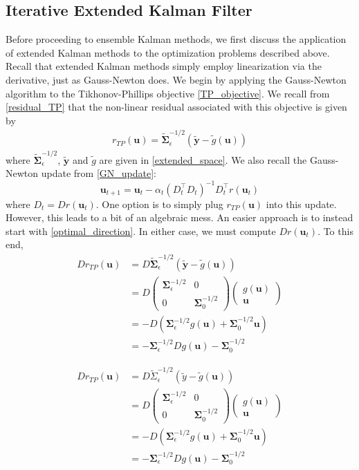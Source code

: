 \documentclass[12pt]{article}
\newcommand{\bpar}{\mathbf{u}} %
\newcommand{\fwd}{g} %
\newcommand{\dataVec}{\mathbf{y}} %
\newcommand{\CovObs}{\boldsymbol{\Sigma}_{\epsilon}} %
\newcommand{\CovPrior}{\boldsymbol{\Sigma}_0} %
\newcommand{\CovObsEx}{\tilde{\boldsymbol{\Sigma}}_{\epsilon}} %
\newcommand{\dataVecEx}{\tilde{\dataVec}} %
\newcommand{\fwdEx}{\tilde{\fwd}} %
\begin{document}
\subsection{Iterative Extended Kalman Filter}
Before proceeding to ensemble Kalman methods, we first discuss the application of extended Kalman methods to the optimization problems described above. Recall that extended Kalman methods simply employ 
linearization via the derivative, just as Gauss-Newton does. We begin by applying the Gauss-Newton algorithm to the Tikhonov-Phillips objective \ref{TP_objective}. We recall from \ref{residual_TP} 
that the non-linear residual associated 
with this objective is given by 
\begin{align*}
r_{TP}(\bpar) = \CovObsEx^{-1/2} (\dataVecEx -\fwdEx(\bpar))
\end{align*}
where $\CovObsEx^{-1/2}$, $\dataVecEx$ and $\fwdEx$ are given in \ref{extended_space}. We also recall the Gauss-Newton update from \ref{GN_update}:
\[ \bpar_{t + 1} = \bpar_t - \alpha_t \left(D_t^\top D_t \right)^{-1} D_t^\top r(\bpar_t) \]
where $D_t = D r(\bpar_t)$. One option is to simply plug $r_{TP}(\bpar)$ into this update. However, this leads to a bit of an algebraic mess. An easier approach is to instead start 
with \ref{optimal_direction}. In either case, we must compute $D r(\bpar_t)$. To this end, 
\begin{align*}
D r_{TP}(\bpar) &= D \CovObsEx^{-1/2} (\dataVecEx - \fwdEx(\bpar)) \\ 
		        &= D \begin{pmatrix} \CovObs^{-1/2} & 0 \\ 0 & \CovPrior^{-1/2} \end{pmatrix} \begin{pmatrix} \fwd(\bpar) \\ \bpar \end{pmatrix} \\
		        &= -D\left(\CovObs^{-1/2} \fwd(\bpar) + \CovPrior^{-1/2}\bpar \right) \\
			&= -\CovObs^{-1/2} D\fwd(\bpar) - \CovPrior^{-1/2}
\end{align*}


\begin{align*}
D r_{TP}(\bpar) &= D \tilde{\Sigma}^{-1/2}_{\epsilon} (\tilde{y} - \tilde{\fwd}(\bpar)) \\
			&= D \begin{pmatrix} \CovObs^{-1/2} & 0 \\ 0 & \CovPrior^{-1/2} \end{pmatrix} \begin{pmatrix} \fwd(\bpar) \\ \bpar \end{pmatrix} \\
			&= -D\left(\CovObs^{-1/2} \fwd(\bpar) + \CovPrior^{-1/2}\bpar \right) \\
			&= -\CovObs^{-1/2} D\fwd(\bpar) - \CovPrior^{-1/2}
\end{align*}
\end{document}
